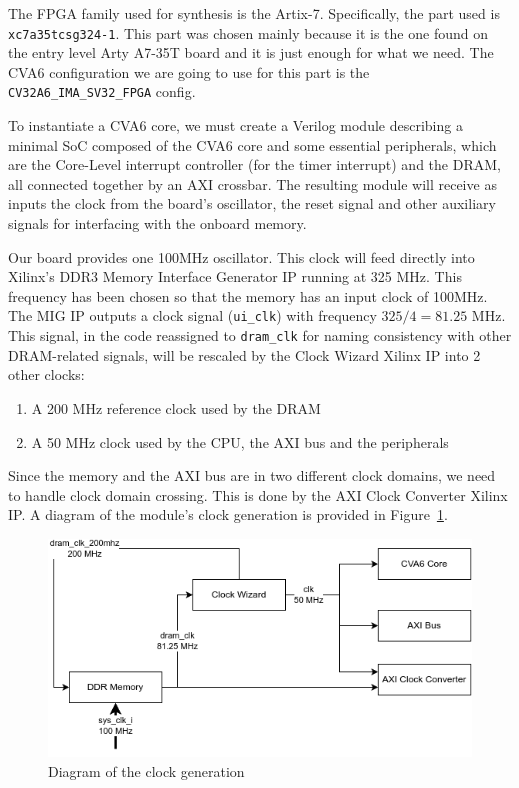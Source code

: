 \documentclass[a4paper,11pt]{article}
\begin{document}
The FPGA family used for synthesis is the Artix-7. Specifically, the part used
is \texttt{xc7a35tcsg324-1}. This part was chosen mainly because it is the one
found on the entry level Arty A7-35T board and it is just enough for what we
need. The CVA6 configuration we are going to use for this part is the
\texttt{CV32A6\_IMA\_SV32\_FPGA} config.

To instantiate a CVA6 core, we must create a Verilog module describing a minimal
SoC composed of the CVA6 core and some essential peripherals, which are the
Core-Level interrupt controller (for the timer interrupt) and the DRAM, all
connected together by an AXI crossbar. The resulting module will receive as inputs
the clock from the board's oscillator, the reset signal and other auxiliary signals
for interfacing with the onboard memory.

Our board provides one 100MHz oscillator. This clock will feed directly into
Xilinx's DDR3 Memory Interface Generator IP running at 325 MHz. This frequency
has been chosen so that the memory has an input clock of 100MHz. The MIG IP
outputs a clock signal (\texttt{ui\_clk}) with frequency $325 / 4 = 81.25$ MHz.
This signal, in the code reassigned to \texttt{dram\_clk} for naming consistency
with other DRAM-related signals, will be rescaled by the Clock Wizard Xilinx IP
into 2 other clocks:

\begin{enumerate}
  \item A 200 MHz reference clock used by the DRAM
  \item A 50 MHz clock used by the CPU, the AXI bus and the peripherals
\end{enumerate}

Since the memory and the AXI bus are in two different clock domains, we need to
handle clock domain crossing. This is done by the AXI Clock Converter Xilinx
IP. A diagram of the module's clock generation is provided in Figure~\ref{clock-diag}.

\begin{figure}[H]
  \centering
  \includegraphics[width=\textwidth]{./img/clocking_diagram.png}
  \caption{Diagram of the clock generation}%
  \label{clock-diag}
\end{figure}
\end{document}
